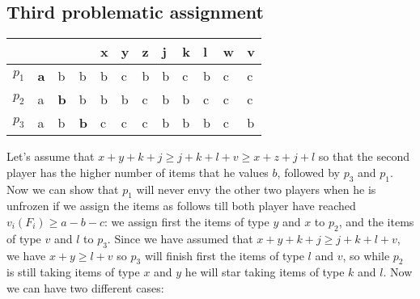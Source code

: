 \documentclass{article}
\begin{document}
\subsection{Third problematic assignment}

\begin{table}[h]
\centering
\begin{tabular}{|l|l|l|l||l|l|l|l|l|l|l|l|}
\hline
      &                 &               &               & x & y & z & j & k & l & w & v \\ \hline
$p_1$ & \textbf{a}     & b             & b             & b & c & b & b & c & b & c & c \\ \hline
$p_2$ & a               & \textbf{b}    & b             & b & b & c & b & b & c & c & c \\ \hline
$p_3$ & a               & b             & \textbf{b}    & c & c & c & b & b & b & c & b \\ \hline
\end{tabular}
\end{table}
Let's assume that $x + y + k + j \ge j + k + l + v \ge x + z + j + l$ so that the second player has the higher number of items that he values $b$, followed by $p_3$ and $p_1$. Now we can show that $p_1$ will never envy the other two players when he is unfrozen if we assign the items as follows till both player have reached $v_i(F_i) \ge a-b-c$: we assign first the items of type $y$ and $x$ to $p_2$, and the items of type $v$ and $l$ to $p_3$. Since we have assumed that $x + y + k + j \ge j + k + l + v $, we have $x + y  \ge  l + v $ so $p_3$ will finish first the items of type $l$ and $v$, so while $p_2$ is still taking items of type $x$ and $y$ he will star taking items of type $k$ and $l$. Now we can have two different cases:
\end{document}
